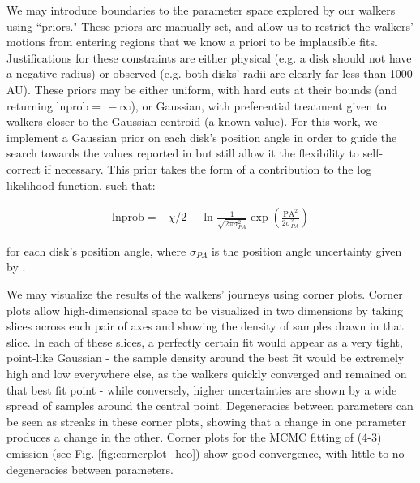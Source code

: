 We may introduce boundaries to the parameter space explored by our walkers using ``priors." These priors are manually set, and allow us to restrict the walkers' motions from entering regions that we know a priori to be implausible fits. Justifications for these constraints are either physical (e.g. a disk should not have a negative radius) or observed (e.g. both disks' radii are clearly far less than 1000 AU). These priors may be either uniform, with hard cuts at their bounds (and returning lnprob$ =\,-\infty$), or Gaussian, with preferential treatment given to walkers closer to the Gaussian centroid (a known value). For this work, we implement a Gaussian prior on each disk's position angle in order to guide the search towards the values reported in \citet{Williams2014} but still allow it the flexibility to self-correct if necessary. This prior takes the form of a contribution to the log likelihood function, such that:

\begin{align}
  \text{lnprob} = -\chi/2  -\ln{\frac{1}{\sqrt{2 \pi \sigma_{PA}^2}}} \exp{\left(\frac{\text{PA}^2}{2 \sigma_{PA}^2}\right)}
\end{align}

\noindent
for each disk's position angle, where $\sigma_{PA}$ is the position angle uncertainty given by \citet{Williams2014}.



We may visualize the results of the walkers' journeys using corner plots. Corner plots allow high-dimensional space to be visualized in two dimensions by taking slices across each pair of axes and showing the density of samples drawn in that slice. In each of these slices, a perfectly certain fit would appear as a very tight, point-like Gaussian - the sample density around the best fit would be extremely high and low everywhere else, as the walkers quickly converged and remained on that best fit point - while conversely, higher uncertainties are shown by a wide spread of samples around the central point. Degeneracies between parameters can be seen as streaks in these corner plots, showing that a change in one parameter produces a change in the other. Corner plots for the MCMC fitting of \hco(4-3) emission (see Fig. \ref{fig:cornerplot_hco}) show good convergence, with little to no degeneracies between parameters.


